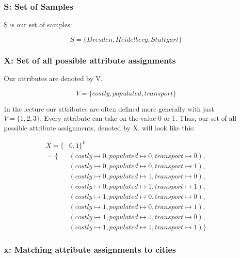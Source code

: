 \documentclass{article}
\begin{document}
\subsubsection{S: Set of Samples}

S is our set of samples:

\begin{equation*}
S = \{Dresden, Heidelberg, Stuttgart\}
\end{equation*}

\subsubsection{X: Set of all possible attribute assignments}

Our attributes are denoted by V.

\begin{equation*}
    V = \{costly, populated, transport\}
\end{equation*}

In the lecture our attributes are often defined more generally with just $V = \{1, 2, 3\}$.
Every attribute can take on the value 0 or 1. Thus, our set of all possible attribute assignments, denoted by X, will look like this:

\begin{equation*}
    \begin{split}
        X = \{&0, 1\}^V \\
         = \{&(costly \mapsto 0, populated \mapsto 0, transport \mapsto 0), \\
        &(costly \mapsto 0, populated \mapsto 0, transport \mapsto 1), \\
        &(costly \mapsto 0, populated \mapsto 1, transport \mapsto 0), \\
        &(costly \mapsto 0, populated \mapsto 1, transport \mapsto 1), \\
        &(costly \mapsto 1, populated \mapsto 0, transport \mapsto 0), \\
        &(costly \mapsto 1, populated \mapsto 0, transport \mapsto 1), \\
        &(costly \mapsto 1, populated \mapsto 1, transport \mapsto 0), \\
        &(costly \mapsto 1, populated \mapsto 1, transport \mapsto 1)\}
    \end{split}
\end{equation*}

\subsubsection{x: Matching attribute assignments to cities}
\end{document}
